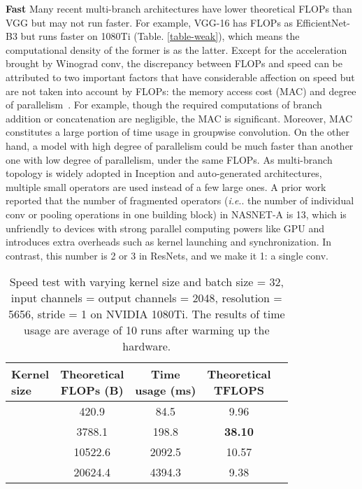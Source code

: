 \documentclass[final]{cvpr}
\makeatletter
\DeclareRobustCommand\onedot{\futurelet\@let@token\@onedot}
\def\@onedot{\ifx\@let@token.\else.\null\fi\xspace}
\def\ie{\emph{i.e}\onedot}
\makeatother
\begin{document}
\textbf{Fast} \quad Many recent multi-branch architectures have lower theoretical FLOPs than VGG but may not run faster. For example, VGG-16 has  FLOPs as EfficientNet-B3 \cite{efficientnet} but runs  faster on 1080Ti (Table. \ref{table-weak}), which means the computational density of the former is  as the latter. Except for the acceleration brought by Winograd conv, the discrepancy between FLOPs and speed can be attributed to two important factors that have considerable affection on speed but are not taken into account by FLOPs: the memory access cost (MAC) and degree of parallelism~\cite{ma2018shufflenet}. For example, though the required computations of branch addition or concatenation are negligible, the MAC is significant. Moreover, MAC constitutes a large portion of time usage in groupwise convolution. On the other hand, a model with high degree of parallelism could be much faster than another one with low degree of parallelism, under the same FLOPs. As multi-branch topology is widely adopted in Inception and auto-generated architectures, multiple small operators are used instead of a few large ones. A prior work \cite{ma2018shufflenet} reported that the number of fragmented operators (\ie the number of individual conv or pooling operations in one building block) in NASNET-A \cite{zoph2016neural} is 13, which is unfriendly to devices with strong parallel computing powers like GPU and introduces extra overheads such as kernel launching and synchronization. In contrast, this number is 2 or 3 in ResNets, and we make it 1: a single conv.


\begin{table}
	\caption{Speed test with varying kernel size and batch size = 32, input channels = output channels = 2048, resolution = 5656, stride = 1 on NVIDIA 1080Ti. The results of time usage are average of 10 runs after warming up the hardware.}
	\label{table-speed-kernelsize}
	\vspace{-0.2in}
	\begin{center}
		\small
			\begin{tabular}{lcccc}
				\hline
				\makecell{Kernel \\ size} 	&\makecell{Theoretical \\ FLOPs (B)}	&\makecell{Time\\usage (ms)}	&\makecell{Theoretical \\ TFLOPS}	 			\\
				\hline
						&	420.9	&	84.5	&9.96\\
						&	3788.1 	&	198.8	&\textbf{38.10}\\
						&	10522.6	&	2092.5	&10.57\\
						&	20624.4	&	4394.3	&9.38\\				
				\hline
			\end{tabular}

	\end{center}
	\vspace{-0.2in}
\end{table}
\end{document}

